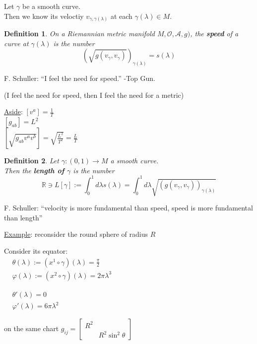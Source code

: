 \documentclass[10pt]{amsart}
\newtheorem{definition}{Definition}
\begin{document}
\begin{multicols*}{2}
	Let $\gamma$ be a smooth curve. \\
	Then we know its veloctiy $v_{\gamma, \gamma(\lambda)}$ at each $\gamma(\lambda) \in M$.  
	
	\begin{definition}
		On a Riemannian metric manifold $M, \mathcal{O},\mathcal{A},g)$, the \textbf{speed} of a curve at $\gamma(\lambda)$ is the number 
		\[
		(\sqrt{ g(v_{\gamma}, v_{\gamma}) })_{\gamma(\lambda)} = s(\lambda)
		\]
	\end{definition}
	
	F. Schuller: ``I feel the need for speed.'' -Top Gun.  
	
	(I feel the need for speed, then I feel the need for a metric)
	
	\underline{Aside}: $[v^a] = \frac{1}{T}$ \\
	\phantom{Aside:} $[g_{ab}] = L^2 $ \\
	\phantom{Aside:} $[\sqrt{g_{ab}v^av^b}] = \sqrt{ \frac{L^2}{T^2}} = \frac{L}{T}$
	
	\begin{definition}
		Let $\gamma:(0,1) \to M$ a smooth curve.  \\
		Then the \textbf{length of $\gamma$} is the number 
		\[
		\mathbb{R} \ni L[\gamma] := \int_0^1 d\lambda s(\lambda) = \int_0^1 d\lambda \sqrt{ (g(v_{\gamma}, v_{\gamma}))_{\gamma(\lambda)}}
		\]
	\end{definition}
	
	F. Schuller: ``velocity is more fundamental than speed, speed is more fundamental than length''
	
	\underline{Example}: reconsider the round sphere of radius $R$
	
	Consider its equator: \\
	$\begin{aligned}
	&  \theta(\lambda) := (x^1 \circ \gamma)(\lambda) = \frac{\pi}{2} \\ 
	& \varphi(\lambda) := (x^2 \circ \gamma)(\lambda) = 2\pi \lambda^3   
	\end{aligned}$
	
	$\begin{aligned}
	& \theta'(\lambda) = 0 \\
	& \varphi'(\lambda) = 6\pi\lambda^2 
	\end{aligned}$
	
	on the same chart $g_{ij} = \left[ \begin{matrix} R^2 & \\ 
	& R^2 \sin^2{\theta} \end{matrix} \right]$
	

\end{multicols*}
\end{document}

